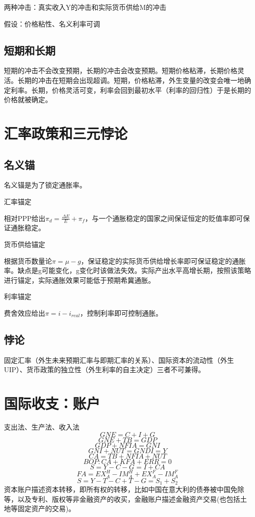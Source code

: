 \documentclass[a4paper, 10pt]{article}
\begin{document}
\noindent 两种冲击：真实收入Y的冲击和实际货币供给M的冲击

\noindent 假设：价格粘性、名义利率可调

\subsection{短期和长期}
\noindent 短期的冲击不会改变预期，长期的冲击会改变预期。短期价格粘滞，长期价格灵活。长期的冲击在短期会出现超调。短期，价格粘滞，外生变量的改变会唯一地确定利率。长期，价格灵活可变，利率会回到最初水平（利率的回归性）于是长期的价格就被确定。

\section{汇率政策和三元悖论}
\subsection{名义锚}
\noindent 名义锚是为了锁定通胀率。

\noindent 汇率锚定

\noindent 相对PPP给出$\pi_d=\frac{\Delta E}{E}+\pi_f$，与一个通胀稳定的国家之间保证恒定的贬值率即可保证通胀稳定。

\noindent 货币供给锚定

\noindent 根据货币数量论$\pi=\mu-g$，保证稳定的实际货币供给增长率即可保证稳定的通胀率。缺点是g可能变化，g变化时该做法失效。实际产出水平高增长期，按照该策略进行锚定，实际通胀效果可能低于预期希冀通胀。

\noindent 利率锚定

\noindent 费舍效应给出$\pi=i-i_{real}$，控制利率即可控制通胀。


\subsection{悖论}
\noindent 固定汇率（外生未来预期汇率与即期汇率的关系）、国际资本的流动性（外生UIP）、货币政策的独立性（外生利率的自主决定）三者不可兼得。

\section{国际收支：账户}
\noindent 支出法、生产法、收入法
$$GNE=C+I+G$$
$$GNE+TB=GDP$$
$$GDP+NFIA=GNI$$
$$GNI+NUT=GNDI=Y$$
$$CA=TB+NFIA+NUT$$
$$BOP:CA+KFA+ERR=0$$
$$S=Y-C-G=I+CA$$
$$FA=EX^H_A-IM^H_A+EX^F_A-IM^F_A$$
$$S=Y-T-C+T-G=S_1+S_2$$
资本账户描述资本转移，即所有权的转移，比如中国在意大利的债券被中国免除等，以及专利、版权等非金融资产的收买，金融账户描述金融资产交易(也包括土地等固定资产的交易)。
\end{document}
